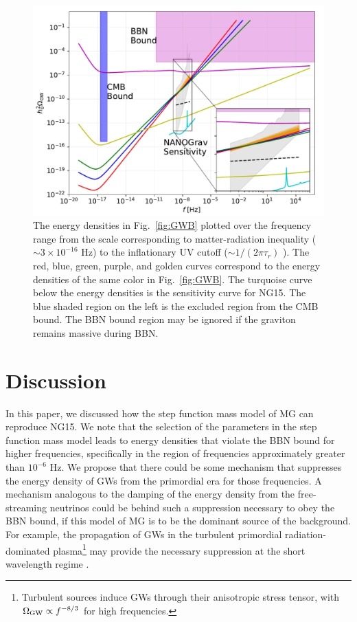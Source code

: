 \documentclass[prd,twocolumn,aps,psfig,nofootinbib,nobibnotes,superscriptaddress,preprintnumbers,times]{revtex4-2}
\begin{document}
\begin{figure}[ht]
    \includegraphics[width=\linewidth]{fig4.pdf}
    \caption{The energy densities in Fig.\ \ref{fig:GWB} plotted over the frequency range from the scale corresponding to matter-radiation inequality ($\sim 3\times10^{-16}$ Hz) to the inflationary UV cutoff ($\sim 1/(2\pi\tau_r)$ \cite{Fujita:2018ehq}). The red, blue, green, purple, and golden curves correspond to the energy densities of the same color in Fig.\ \ref{fig:GWB}. The turquoise curve below the energy densities is the sensitivity curve for NG15. The blue shaded region on the left is the excluded region from the CMB bound. The BBN bound region may be ignored if the graviton remains massive during BBN.} 
    \label{fig:supp}
\end{figure}

\section{Discussion}\label{sec:discussion}
In this paper, we discussed how the step function mass model of MG can reproduce NG15. We note that the selection of the parameters in the step function mass model leads to energy densities that violate the BBN bound for higher frequencies, specifically in the region of frequencies approximately greater than $10^{-6}$ Hz. We propose that there could be some mechanism that suppresses the energy density of GWs from the primordial era for those frequencies. A mechanism analogous to the damping of the energy density from the free-streaming neutrinos \cite{Durrer:1997ta,Weinberg:2003ur} could be behind such a suppression necessary to obey the BBN bound, if this model of MG is to be the dominant source of the background. For example, the propagation of GWs in the turbulent primordial radiation-dominated plasma\footnote{Turbulent sources induce GWs through their anisotropic stress tensor, with $\Omega_{\rm GW} \propto f^{-8/3}$ for high frequencies.} \cite{RoperPol:2019wvy} may provide the necessary suppression at the short wavelength regime \cite{Deryagin:1986}. 
\end{document}
